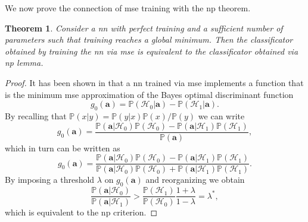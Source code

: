 \documentclass[draftcls,onecolumn,12pt]{IEEEtran}
\newtheorem{theorem}{Theorem}
\begin{document}
We now prove the connection of \ac{mse} training with the \ac{np} theorem.
\begin{theorem}
\label{th:nn_np}
Consider a \ac{nn} with perfect training and a sufficient number of parameters such that training reaches a global minimum. Then the classificator obtained by training the \ac{nn} via \ac{mse} is equivalent to the classificator obtained via \ac{np} lemma.
\end{theorem}
\begin{proof}
It has been shown in \cite{Ruck-90} that a \ac{nn} trained via \ac{mse} implements a function that is the minimum \ac{mse} approximation of the Bayes optimal discriminant function
\begin{equation}\label{eq:bayesDisc}
g_0(\bm{a}) = \mathbb{P}(\mathcal{H}_0|\bm{a}) - \mathbb{P}(\mathcal{H}_1|\bm{a}).
\end{equation} 
By recalling that $\mathbb{P}(x|y)=\mathbb{P}(y|x)\mathbb{P}(x)/\mathbb{P}(y)$ we can write
\begin{equation}
g_0(\bm{a}) = \frac{{\mathbb P}(\bm{a}|\mathcal H_0){\mathbb P}(\mathcal H_0) - {\mathbb P}(\bm{a}|\mathcal H_1){\mathbb P}(\mathcal H_1)}{\mathbb P(\bm{a})},
\end{equation}
which in turn can be written as
\begin{equation}
g_0(\bm{a}) = \frac{{\mathbb P}(\bm{a}|\mathcal H_0){\mathbb P}(\mathcal H_0) - {\mathbb P}(\bm{a}|\mathcal H_1){\mathbb P}(\mathcal H_1)}{{\mathbb P}(\bm{a}|\mathcal H_0){\mathbb P}(\mathcal H_0) + {\mathbb P}(\bm{a}|\mathcal H_1){\mathbb P}(\mathcal H_1)}.
\end{equation}
By imposing a threshold $\lambda$ on $g_0(\bm{a})$ and reorganizing we obtain
\begin{equation}
\frac{{\mathbb P}(\bm{a}|\mathcal H_0)}{{\mathbb P}(\bm{a}|\mathcal H_1)}>   \frac{{\mathbb P}(\mathcal H_1)}{{\mathbb P}(\mathcal H_0)} \frac{1 + \lambda}{1-\lambda} = \lambda^*,
\end{equation}
which is equivalent to the \ac{np} criterion.
\end{proof}
\end{document}
